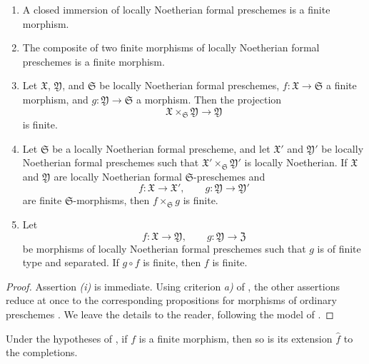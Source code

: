 \begin{proposition}[4.8.3]
\label{III.4.8.3}
\begin{enumerate}
  \item[\rm{(i)}] A closed immersion of locally Noetherian formal
    preschemes is a finite morphism.
  \item[\rm{(ii)}] The composite of two finite morphisms of locally
    Noetherian formal preschemes is a finite morphism.
  \item[\rm{(iii)}] Let $\mathfrak{X}$, $\mathfrak{Y}$, and
    $\mathfrak{S}$ be locally Noetherian formal preschemes,
    $f:\mathfrak{X}\to\mathfrak{S}$ a finite morphism, and
    $g:\mathfrak{Y}\to\mathfrak{S}$ a morphism.  Then the projection
    \[
      \mathfrak{X}\times_{\mathfrak{S}}\mathfrak{Y}
      \longrightarrow\mathfrak{Y}
    \]
    is finite.
  \item[\rm{(iv)}] Let $\mathfrak{S}$ be a locally Noetherian formal
    prescheme, and let $\mathfrak{X}'$ and $\mathfrak{Y}'$ be
    locally Noetherian formal preschemes such that
    $\mathfrak{X}'\times_{\mathfrak{S}}\mathfrak{Y}'$ is locally
    Noetherian.  If $\mathfrak{X}$ and $\mathfrak{Y}$ are locally
    Noetherian formal $\mathfrak{S}$-preschemes and
    \[
      f:\mathfrak{X}\to\mathfrak{X}',\qquad
      g:\mathfrak{Y}\to\mathfrak{Y}'
    \]
    are finite $\mathfrak{S}$-morphisms, then
    $f\times_{\mathfrak{S}}g$ is finite.
  \item[\rm{(v)}] Let
    \[
      f:\mathfrak{X}\to\mathfrak{Y},\qquad
      g:\mathfrak{Y}\to\mathfrak{Z}
    \]
    be morphisms of locally Noetherian formal preschemes such that
    $g$ is of finite type and separated.  If $g\circ f$ is finite,
    then $f$ is finite.
\end{enumerate}
\end{proposition}

\begin{proof}
Assertion \emph{(i)} is immediate.  Using criterion \emph{a)} of
, the other assertions reduce at once to the
corresponding propositions for morphisms of ordinary preschemes
.  We leave the details to the reader, following
the model of .
\end{proof}

\begin{corollary}[4.8.4]
\label{III.4.8.4}
Under the hypotheses of , if $f$ is a finite
morphism, then so is its extension $\widehat{f}$ to the
completions.
\end{corollary}

